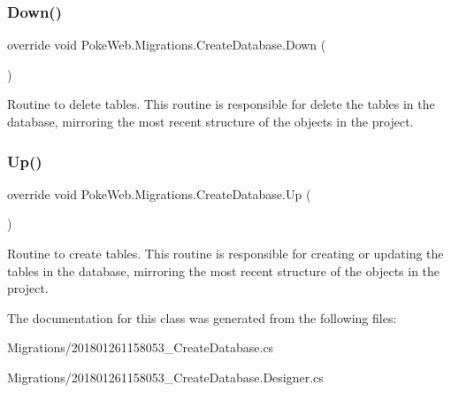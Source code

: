 \subsubsection{\texorpdfstring{Down()}{Down()}}
{\footnotesize\ttfamily override void Poke\+Web.\+Migrations.\+Create\+Database.\+Down (\begin{DoxyParamCaption}{ }\end{DoxyParamCaption})\hspace{0.3cm}{\ttfamily [inline]}}

Routine to delete tables. This routine is responsible for delete the tables in the database, mirroring the most recent structure of the objects in the project. \mbox{\label{class_poke_web_1_1_migrations_1_1_create_database_a1cc4a85b9c4fd02e5fc0203416de5e72}} 
\subsubsection{\texorpdfstring{Up()}{Up()}}
{\footnotesize\ttfamily override void Poke\+Web.\+Migrations.\+Create\+Database.\+Up (\begin{DoxyParamCaption}{ }\end{DoxyParamCaption})\hspace{0.3cm}{\ttfamily [inline]}}

Routine to create tables. This routine is responsible for creating or updating the tables in the database, mirroring the most recent structure of the objects in the project. 

The documentation for this class was generated from the following files\+:\begin{DoxyCompactItemize}
\item 
Migrations/201801261158053\+\_\+\+Create\+Database.\+cs\item 
Migrations/201801261158053\+\_\+\+Create\+Database.\+Designer.\+cs\end{DoxyCompactItemize}
